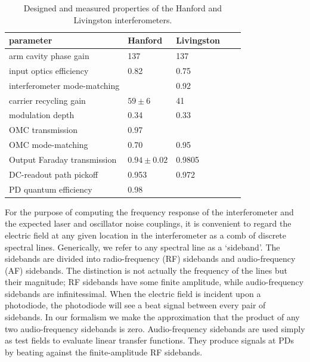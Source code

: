 \begin{table}
\centering
\begin{tabular}{l l l l l}
\hline 
\textbf{parameter}          &\textbf{Hanford}&\textbf{Livingston}  \\
\hline
arm cavity phase gain       & 137            & 137         \\
input optics efficiency     & 0.82           & 0.75        \\
interferometer mode-matching&                & 0.92        \\
carrier recycling gain      & $59\pm6$       & 41          \\
modulation depth            & 0.34           & 0.33        \\
OMC transmission            & 0.97           &             \\
OMC mode-matching           & 0.70           & 0.95        \\
Output Faraday transmission & $0.94\pm0.02$  & 0.9805      \\
DC-readout path pickoff     & 0.953          & 0.972       \\
PD quantum efficiency       & 0.98           &             \\
\hline
\end{tabular}
\caption{Designed and measured properties of the Hanford and Livingston interferometers.}
\label{tab:ifo-properties}
\end{table}




For the purpose of computing the frequency response of the interferometer and
the expected laser and oscillator noise couplings, it is convenient to regard
the electric field at any given location in the interferometer as a comb of
discrete spectral lines.  Generically, we refer to any spectral line as a
`sideband'.  The sidebands are divided into radio-frequency (RF) sidebands and
audio-frequency (AF) sidebands. The distinction is not actually the frequency of
the lines but their magnitude; RF sidebands have some finite amplitude, while
audio-frequency sidebands are infinitessimal.  When the electric field is
incident upon a photodiode, the photodiode will see a beat signal between every
pair of sidebands.  In our formalism we make the approximation that the product
of any two audio-frequency sidebands is zero.  Audio-frequency sidebands are
used simply as test fields to evaluate linear transfer functions.  They produce
signals at PDs by beating against the finite-amplitude RF sidebands.

